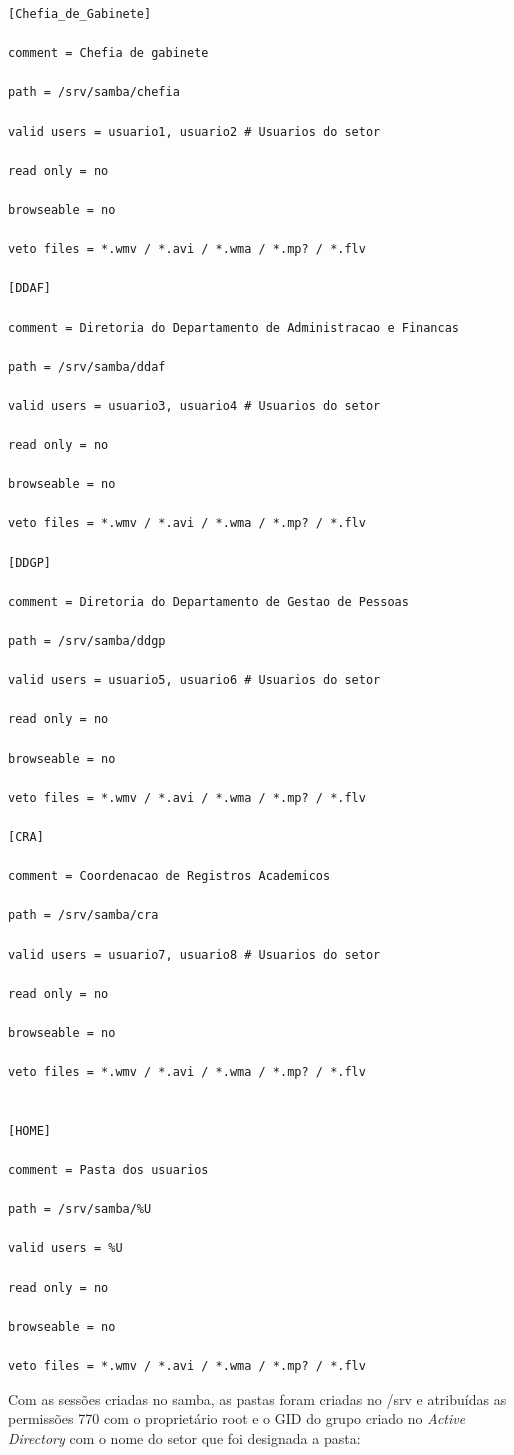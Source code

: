 \begin{lstlisting}
[Chefia_de_Gabinete]

comment = Chefia de gabinete

path = /srv/samba/chefia

valid users = usuario1, usuario2 # Usuarios do setor

read only = no

browseable = no

veto files = *.wmv / *.avi / *.wma / *.mp? / *.flv

[DDAF] 

comment = Diretoria do Departamento de Administracao e Financas

path = /srv/samba/ddaf

valid users = usuario3, usuario4 # Usuarios do setor

read only = no

browseable = no

veto files = *.wmv / *.avi / *.wma / *.mp? / *.flv

[DDGP] 

comment = Diretoria do Departamento de Gestao de Pessoas

path = /srv/samba/ddgp

valid users = usuario5, usuario6 # Usuarios do setor

read only = no

browseable = no

veto files = *.wmv / *.avi / *.wma / *.mp? / *.flv

[CRA] 

comment = Coordenacao de Registros Academicos

path = /srv/samba/cra

valid users = usuario7, usuario8 # Usuarios do setor

read only = no

browseable = no

veto files = *.wmv / *.avi / *.wma / *.mp? / *.flv


[HOME] 

comment = Pasta dos usuarios

path = /srv/samba/%U

valid users = %U

read only = no

browseable = no

veto files = *.wmv / *.avi / *.wma / *.mp? / *.flv
\end{lstlisting}

Com as sessões criadas no samba, as pastas foram criadas no /srv e atribuídas as permissões 770 com o proprietário root e o GID do grupo criado no \textit{Active Directory} com o nome do setor que foi designada a pasta:\\

